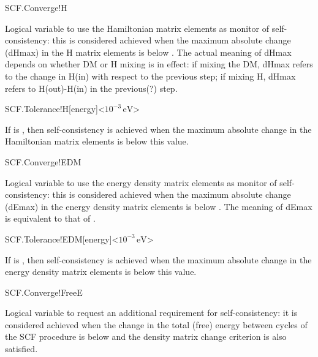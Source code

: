 \begin{fdflogicalT}{SCF.Converge!H}

  Logical variable to use the Hamiltonian matrix elements as monitor
  of self-consistency: this is considered achieved when the maximum
  absolute change (dHmax) in the H matrix elements is below
  . The actual meaning of dHmax depends on
  whether DM or H mixing is in effect: if mixing the DM, dHmax refers
  to the change in H(in) with respect to the previous step; if mixing
  H, dHmax refers to H(out)-H(in) in the previous(?) step. 
  
\end{fdflogicalT}

\begin{fdfentry}{SCF.Tolerance!H}[energy]<$10^{-3}\,\mathrm{eV}$>

  If  is \fdftrue, then self-consistency is
  achieved when the maximum absolute change in the Hamiltonian matrix
  elements is below this value.
  
\end{fdfentry}


\begin{fdflogicalT}{SCF.Converge!EDM}

  Logical variable to use the energy density matrix elements as monitor
  of self-consistency: this is considered achieved when the maximum
  absolute change (dEmax) in the energy density matrix elements is below
  . The meaning of dEmax is equivalent to that
  of .
  
\end{fdflogicalT}

\begin{fdfentry}{SCF.Tolerance!EDM}[energy]<$10^{-3}\,\mathrm{eV}$>

  If  is \fdftrue, then self-consistency is
  achieved when the maximum absolute change in the energy density
  matrix elements is below this value.
  
\end{fdfentry}


\begin{fdflogicalF}{SCF.Converge!FreeE}

  Logical variable to request an additional requirement for
  self-consistency: it is considered achieved when the change in the
  total (free) energy between cycles of the SCF procedure is below
   and the density matrix change criterion is
  also satisfied.

\end{fdflogicalF}

